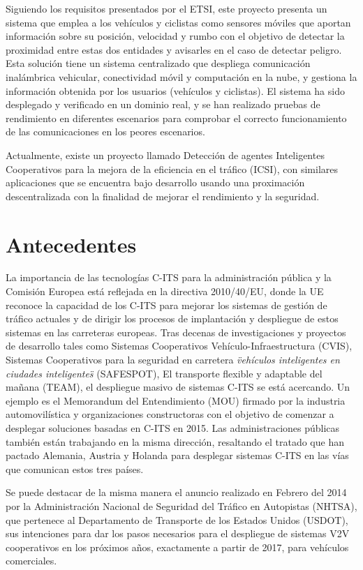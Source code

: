 Siguiendo los requisitos presentados por el ETSI, este proyecto presenta un sistema que emplea a los vehículos y
ciclistas como sensores móviles que aportan información sobre su posición, velocidad y rumbo con el objetivo de
detectar la proximidad entre estas dos entidades y avisarles en el caso de detectar peligro. Esta solución tiene un
sistema centralizado que despliega comunicación inalámbrica vehicular, conectividad móvil y computación en la nube,
y gestiona la información obtenida por los usuarios (vehículos y ciclistas). El sistema ha sido desplegado y verificado
en un dominio real, y se han realizado pruebas de rendimiento en diferentes escenarios para comprobar el correcto
funcionamiento de las comunicaciones en los peores escenarios.

Actualmente, existe un proyecto llamado Detección de agentes Inteligentes Cooperativos para la mejora de la eficiencia
en el tráfico (ICSI), con similares aplicaciones que se encuentra bajo desarrollo usando una proximación
descentralizada con la finalidad de mejorar el rendimiento y la seguridad.

\section{Antecedentes}\label{section:antecedentes}
La importancia de las tecnologías C-ITS para la administración pública y la Comisión Europea está reflejada en la
directiva 2010/40/EU, donde la UE reconoce la capacidad de los C-ITS para mejorar los sistemas de gestión de tráfico
actuales y de dirigir los procesos de implantación y despliegue de estos sistemas en las carreteras europeas. Tras
decenas de investigaciones y proyectos de desarrollo tales como Sistemas Cooperativos Vehículo-Infraestructura (CVIS),
Sistemas Cooperativos para la seguridad en carretera \emph{\"vehículos inteligentes en ciudades inteligentes\"}
(SAFESPOT), El transporte flexible y adaptable del mañana (TEAM), el despliegue masivo de sistemas C-ITS se está
acercando. Un ejemplo es el Memorandum del Entendimiento (MOU) firmado por la industria automovilística y
organizaciones constructoras con el objetivo de comenzar a desplegar soluciones basadas en C-ITS en 2015. Las
administraciones públicas también están trabajando en la misma dirección, resaltando el tratado que han pactado
Alemania, Austria y Holanda para desplegar sistemas C-ITS en las vías que comunican estos tres países.

Se puede destacar de la misma manera el anuncio realizado en Febrero del 2014 por la Administración Nacional de
Seguridad del Tráfico en Autopistas (NHTSA), que pertenece al Departamento de Transporte de los Estados Unidos
(USDOT), sus intenciones para dar los pasos necesarios para el despliegue de sistemas V2V cooperativos en los
próximos años, exactamente a partir de 2017, para vehículos comerciales.
